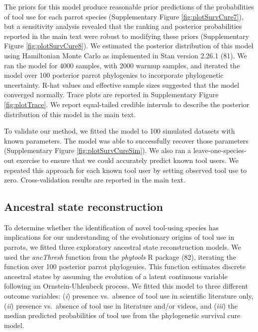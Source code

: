 \documentclass[
  man, donotrepeattitle,floatsintext]{apa6}
\begin{document}
The priors for this model produce reasonable prior predictions of the
probabilities of tool use for each parrot species (Supplementary Figure
\ref{fig:plotSurvCure7}), but a sensitivity analysis revealed that the ranking
and posterior probabilities reported in the main text were robust to modifying
these priors (Supplementary Figure \ref{fig:plotSurvCure8}). We estimated the
posterior distribution of this model using Hamiltonian Monte Carlo as
implemented in Stan version 2.26.1 (81). We ran the model for 4000
samples, with 2000 warmup samples, and iterated the model over 100 posterior
parrot phylogenies to incorporate phylogenetic uncertainty. R-hat values and
effective sample sizes suggested that the model converged normally. Trace plots
are reported in Supplementary Figure \ref{fig:plotTrace}. We report
equal-tailed credible intervals to describe the posterior distribution of this
model in the main text.

To validate our method, we fitted the model to 100 simulated datasets with known
parameters. The model was able to successfully recover those parameters
(Supplementary Figure \ref{fig:plotSurvCureSim}). We also ran a
leave-one-species-out exercise to ensure that we could accurately predict known
tool users. We repeated this approach for each known tool user by setting
observed tool use to zero. Cross-validation results are reported in the main
text.

\hypertarget{ancestral-state-reconstruction}{%
\subsection{Ancestral state reconstruction}\label{ancestral-state-reconstruction}}

To determine whether the identification of novel tool-using species has
implications for our understanding of the evolutionary origins of tool use in
parrots, we fitted three exploratory ancestral state reconstruction models. We
used the \emph{ancThresh} function from the \emph{phytools} R package (82),
iterating the function over 100 posterior parrot phylogenies. This function
estimates discrete ancestral states by assuming the evolution of a latent
continuous variable following an Ornstein-Uhlenbeck process. We fitted this
model to three different outcome variables: (\emph{i}) presence vs.~absence of tool
use in scientific literature only, (\emph{ii}) presence vs.~absence of tool use in
literature and/or videos, and (\emph{iii}) the median predicted probabilities of tool
use from the phylogenetic survival cure model.
\end{document}
